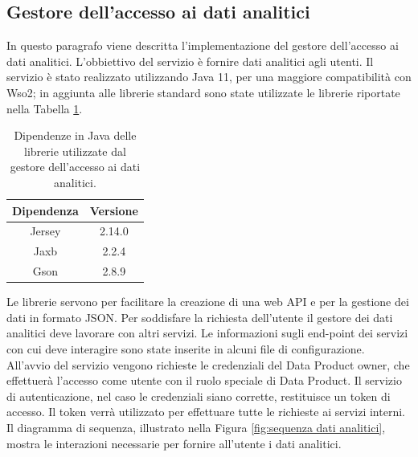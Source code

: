 \documentclass[12pt]{report}
\begin{document}
\subsection{Gestore dell'accesso ai dati analitici}
In questo paragrafo viene descritta l'implementazione del gestore dell'accesso ai dati analitici.
L'obbiettivo del servizio è fornire dati analitici agli utenti.
Il servizio è stato realizzato utilizzando Java 11, per una maggiore compatibilità con Wso2; in aggiunta alle librerie standard sono state utilizzate le librerie riportate nella Tabella \ref{tab:dependencies}.
\begin{table}[H]
\centering
\begin{tabular}{|c|c|}
    \hline
    Dipendenza & Versione \\
    \hline
    Jersey & 2.14.0 \\
    Jaxb & 2.2.4 \\
    Gson & 2.8.9 \\
    \hline
\end{tabular}
\caption{Dipendenze in Java delle librerie utilizzate dal gestore dell'accesso ai dati analitici.}
\label{tab:dependencies}
\end{table}
Le librerie servono per facilitare la creazione di una web API e per la gestione dei dati in formato JSON.
Per soddisfare la richiesta dell'utente il gestore dei dati analitici deve lavorare con altri servizi.
Le informazioni sugli end-point dei servizi con cui deve interagire sono state inserite in alcuni file di configurazione.
All'avvio del servizio vengono richieste le credenziali del Data Product owner, che effettuerà l'accesso come utente con il ruolo speciale di Data Product.
Il servizio di autenticazione, nel caso le credenziali siano corrette, restituisce un token di accesso.
Il token verrà utilizzato per effettuare tutte le richieste ai servizi interni.
Il diagramma di sequenza, illustrato nella Figura \ref{fig:sequenza dati analitici}, mostra le interazioni necessarie per fornire all'utente i dati analitici.
\end{document}
